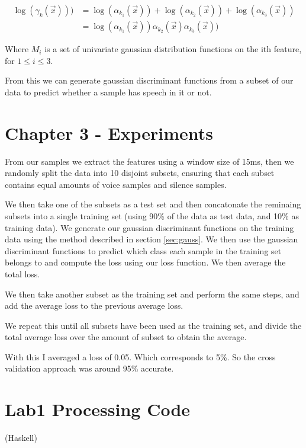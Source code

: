 \documentclass[a4paper]{article}
\begin{document}
\begin{equation}
\begin{split}
\log(\gamma_k(\vec x))) &= \log(\alpha_{k_1}(\vec x)) + \log(\alpha_{k_2}(\vec x)) + \log(\alpha_{k_3}(\vec x))\\
 &= \log(\alpha_{k_1}(\vec x)) \alpha_{k_2}(\vec x) \alpha_{k_3}(\vec x))
\end{split}
\end{equation}


Where $M_i$ is a set of univariate gaussian distribution functions on the ith feature,
for $ 1 \leq i \leq 3$.

From this we can generate gaussian discriminant functions from a subset of our data to
predict whether a sample has speech in it or not.


\section{Chapter 3 - Experiments}

From our samples we extract the features using a window size of 15ms, then we randomly
split the data into 10 disjoint subsets, ensuring that each subset contains equal amounts
of voice samples and silence samples. 

We then take one of the subsets as a test set and then 
concatonate the reminaing subsets into a single training set (using 90\% of the data
as test data, and 10\% as training data). We generate our gaussian discriminant functions
on the training data using the method described in section \ref{sec:gauss}. We then
use the gaussian discriminant functions to predict which class each sample in the training
set belongs to and compute the loss using our loss function. We then average the total
loss.

We then take another subset as the training set and perform the same steps, and add the average loss
to the previous average loss.

We repeat this until all subsets have been used as the training set, and divide the total average
loss over the amount of subset to obtain the average.

With this I averaged a loss of 0.05. Which corresponds to 5\%. So the cross validation
approach was around 95\% accurate.



\newpage

\appendix

\section{Lab1 Processing Code} (Haskell)
\end{document}
